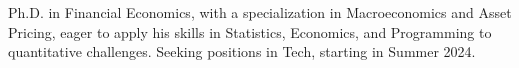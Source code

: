 


\begin{cvparagraph}
	Ph.D. in Financial Economics, with a specialization in Macroeconomics and Asset Pricing, eager to apply his skills in Statistics, Economics, and Programming to quantitative challenges. Seeking positions in Tech, starting in Summer 2024.
\end{cvparagraph}
